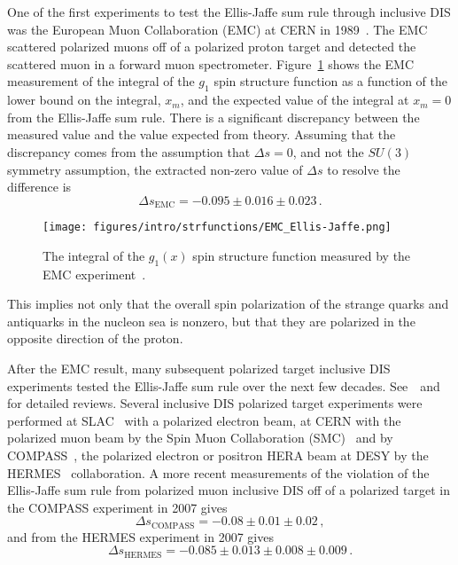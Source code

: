   One of the first experiments to test the Ellis-Jaffe sum rule through
  inclusive DIS was the European Muon Collaboration (EMC) at CERN in
  1989~\cite{Ashman:1987hv,Ashman:1989ig}. The EMC scattered polarized muons
  off of a polarized proton target and detected the scattered muon in a forward
  muon spectrometer. Figure~\ref{fig:emcej} shows the EMC measurement of the
  integral of the $g_1$ spin structure function as a function of the lower
  bound on the integral, $x_m$, and the expected value of the integral at $x_m
  = 0$ from the Ellis-Jaffe sum rule. There is a significant discrepancy
  between the measured value and the value expected from theory. Assuming that
  the discrepancy comes from the assumption that $\Delta s = 0$, and not the
  $SU(3)$ symmetry assumption, the extracted non-zero value of $\Delta s$ to
  resolve the difference is
  \begin{equation*}
    \Delta s_{\textrm{EMC}} = -0.095 \pm 0.016 \pm 0.023 \,.
  \end{equation*}
  \begin{figure}[h]
    \centering
    \texttt{[image: figures/intro/strfunctions/EMC\_Ellis-Jaffe.png]}
    \caption{The integral of the $g_1(x)$ spin structure function measured by
      the EMC experiment~\cite{Ashman:1989ig}.}
    \label{fig:emcej}
  \end{figure}
  This implies not only that the overall spin polarization of the strange
  quarks and antiquarks in the nucleon sea is nonzero, but that they are
  polarized in the opposite direction of the proton.

  After the EMC result, many subsequent polarized target inclusive DIS
  experiments tested the Ellis-Jaffe sum rule over the next few decades.
  See~\cite{Aidala:2012mv}~and~\cite{Bass:2007zzb} for detailed reviews.
  Several inclusive DIS polarized target experiments were performed at
  SLAC~\cite{Baum:1983ha,Anthony:1996mw,Abe:1998wq} with a polarized electron
  beam, at CERN with the polarized muon beam by the Spin Muon Collaboration
  (SMC)~\cite{Adeva:1993km,Adeva:1998vv} and by
  COMPASS~\cite{Alexakhin:2006oza}, the polarized electron or positron HERA
  beam at DESY by the
  HERMES~\cite{Ackerstaff:1997ws,Ackerstaff:1999ey,Airapetian:2006vy}
  collaboration. A more recent measurements of the violation of the
  Ellis-Jaffe sum rule from polarized muon inclusive DIS off of a polarized
  target in the COMPASS experiment in 2007 gives~\cite{Alexakhin:2006oza}
  \begin{equation*}
    \Delta s_{\textrm{COMPASS}} = -0.08 \pm 0.01 \pm 0.02 \,,
  \end{equation*}
  and from the HERMES experiment in 2007 gives~\cite{Airapetian:2006vy}
  \begin{equation*}
    \Delta s_{\textrm{HERMES}} = -0.085 \pm 0.013 \pm 0.008 \pm 0.009 \,.
  \end{equation*}

